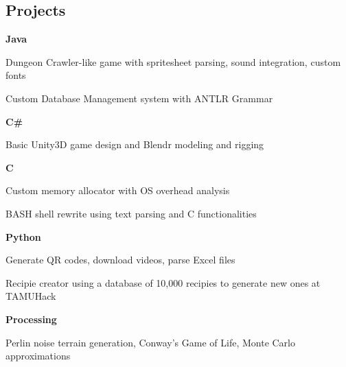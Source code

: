 \documentclass[10pt,letterpaper]{article}
\newenvironment{indentsection}[1]%
{\begin{list}{}%
	{\setlength{\leftmargin}{#1}}%
	\item[]%
}
{\end{list}}
\newcommand{\CPP}
{C\nolinebreak[4]\hspace{-.05em}\raisebox{.22ex}{\footnotesize\bf ++}}
\begin{document}
\subsection*{Projects}
\begin{indentsection}{\parindent}
	\begin{itemize*}
	\item \textbf{Java} 
	\vspace{-0.4em}
		\begin{itemize*}
			\item Dungeon Crawler-like game with spritesheet parsing, sound integration, custom fonts 
			\item Custom Database Management system with ANTLR Grammar 
		\end{itemize*}
	\item \textbf{C\#} 
	\vspace{-0.4em}
		\begin{itemize*}
			\item Basic Unity3D game design and Blendr modeling and rigging 
		\end{itemize*}
	\item \textbf{\CPP}
	\vspace{-0.4em}
		\begin{itemize*}
			\item Custom memory allocator with OS overhead analysis
			\item BASH shell rewrite using text parsing and C functionalities 
		\end{itemize*}
	\item \textbf{Python}
	\vspace{-0.4em}
		\begin{itemize*}
			\item Generate QR codes, download videos, parse Excel files
			\item Recipie creator using a database of 10,000 recipies to generate new ones at 				TAMUHack 
		\end{itemize*}
	\item \textbf{Processing}
	\vspace{-0.4em}
		\begin{itemize*}
			\item Perlin noise terrain generation, Conway's Game of Life, Monte Carlo 								approximations
		\end{itemize*}
	\end{itemize*}
\end{indentsection}
\end{document}
